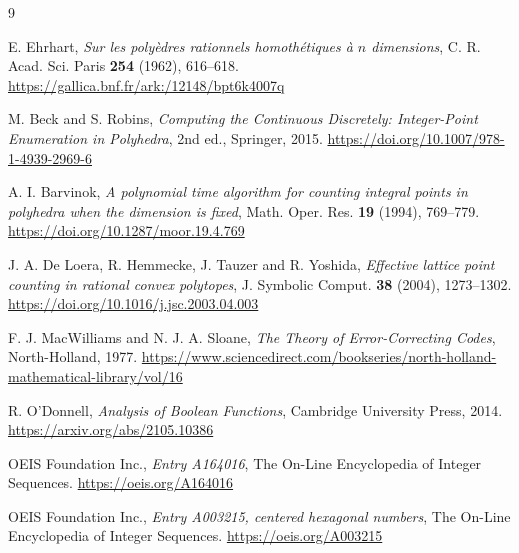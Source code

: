 \documentclass[11pt]{amsart}
\theoremstyle{definition}
\theoremstyle{remark}
\begin{document}
\begin{thebibliography}{9}

E. Ehrhart, \emph{Sur les poly\`edres rationnels homoth\'etiques \`a $n$ dimensions}, C. R. Acad. Sci. Paris \textbf{254} (1962), 616--618. \url{https://gallica.bnf.fr/ark:/12148/bpt6k4007q}

M. Beck and S. Robins, \emph{Computing the Continuous Discretely: Integer-Point Enumeration in Polyhedra}, 2nd ed., Springer, 2015. \url{https://doi.org/10.1007/978-1-4939-2969-6}

A. I. Barvinok, \emph{A polynomial time algorithm for counting integral points in polyhedra when the dimension is fixed}, Math. Oper. Res. \textbf{19} (1994), 769--779. \url{https://doi.org/10.1287/moor.19.4.769}

J. A. De Loera, R. Hemmecke, J. Tauzer and R. Yoshida, \emph{Effective lattice point counting in rational convex polytopes}, J. Symbolic Comput. \textbf{38} (2004), 1273--1302. \url{https://doi.org/10.1016/j.jsc.2003.04.003}

F. J. MacWilliams and N. J. A. Sloane, \emph{The Theory of Error-Correcting Codes}, North-Holland, 1977. \url{https://www.sciencedirect.com/bookseries/north-holland-mathematical-library/vol/16}

R. O'Donnell, \emph{Analysis of Boolean Functions}, Cambridge University Press, 2014. \url{https://arxiv.org/abs/2105.10386}

OEIS Foundation Inc., \emph{Entry A164016}, The On-Line Encyclopedia of Integer Sequences. \url{https://oeis.org/A164016}

OEIS Foundation Inc., \emph{Entry A003215, centered hexagonal numbers}, The On-Line Encyclopedia of Integer Sequences. \url{https://oeis.org/A003215}

\end{thebibliography}
\end{document}
